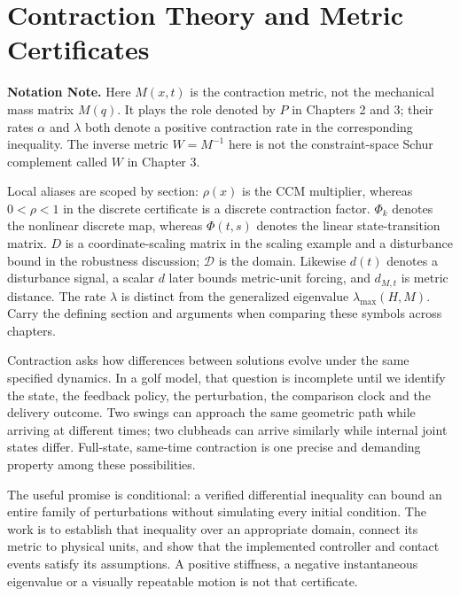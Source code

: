\chapter{Contraction Theory and Metric Certificates}
\label{ch:contraction}
\label{laymans:shrinking_mistakes}

\noindent\textbf{Notation Note.} Here $M(x,t)$ is the contraction metric, not the mechanical mass matrix $M(q)$. It plays the role denoted by $P$ in Chapters 2 and 3; their rates $\alpha$ and $\lambda$ both denote a positive contraction rate in the corresponding inequality. The inverse metric $W=M^{-1}$ here is not the constraint-space Schur complement called $W$ in Chapter 3.

Local aliases are scoped by section: $\rho(x)$ is the CCM multiplier, whereas $0<\rho<1$ in the discrete certificate is a discrete contraction factor. $\Phi_k$ denotes the nonlinear discrete map, whereas $\Phi(t,s)$ denotes the linear state-transition matrix. $D$ is a coordinate-scaling matrix in the scaling example and a disturbance bound in the robustness discussion; $\mathcal D$ is the domain. Likewise $d(t)$ denotes a disturbance signal, a scalar $d$ later bounds metric-unit forcing, and $d_{M,t}$ is metric distance. The rate $\lambda$ is distinct from the generalized eigenvalue $\lambda_{\max}(H,M)$. Carry the defining section and arguments when comparing these symbols across chapters.

Contraction asks how differences between solutions evolve under the same specified dynamics. In a golf model, that question is incomplete until we identify the state, the feedback policy, the perturbation, the comparison clock and the delivery outcome. Two swings can approach the same geometric path while arriving at different times; two clubheads can arrive similarly while internal joint states differ. Full-state, same-time contraction is one precise and demanding property among these possibilities.

The useful promise is conditional: a verified differential inequality can bound an entire family of perturbations without simulating every initial condition. The work is to establish that inequality over an appropriate domain, connect its metric to physical units, and show that the implemented controller and contact events satisfy its assumptions. A positive stiffness, a negative instantaneous eigenvalue or a visually repeatable motion is not that certificate.

